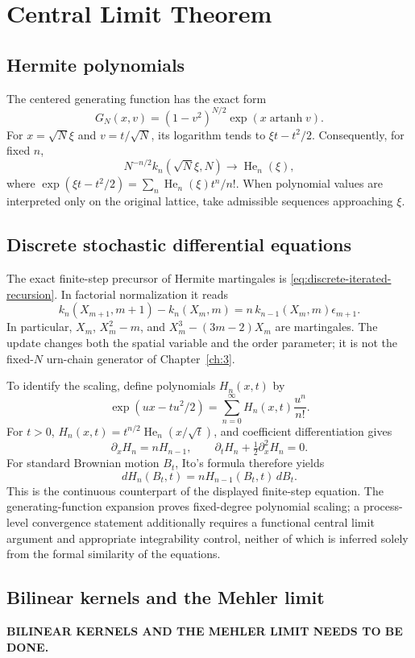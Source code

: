 \chapter{Central Limit Theorem}
\label{ch:11}
\section{Hermite polynomials}
\label{sec:11-1}
The centered generating function has the exact form
\[
G_N(x,v)=(1-v^2)^{N/2}\exp(x\operatorname{artanh}v).
\]
For $x=\sqrt N\xi$ and $v=t/\sqrt N$, its logarithm tends to $\xi t-t^2/2$. Consequently, for fixed $n$,
\[
N^{-n/2}k_n(\sqrt N\xi,N)\longrightarrow\operatorname{He}_n(\xi),
\]
where $\exp(\xi t-t^2/2)=\sum_n\operatorname{He}_n(\xi)t^n/n!$. When polynomial values are interpreted only on the original lattice, take admissible sequences approaching $\xi$.

\section{Discrete stochastic differential equations}
\label{sec:11-2}
The exact finite-step precursor of Hermite martingales is \eqref{eq:discrete-iterated-recursion}. In factorial normalization it reads
\[
k_n(X_{m+1},m+1)-k_n(X_m,m)
=n\,k_{n-1}(X_m,m)\epsilon_{m+1}.
\]
In particular, $X_m$, $X_m^2-m$, and $X_m^3-(3m-2)X_m$ are martingales. The update changes both the spatial variable and the order parameter; it is not the fixed-$N$ urn-chain generator of Chapter~\ref{ch:3}.

To identify the scaling, define polynomials $H_n(x,t)$ by
\[
\exp(ux-tu^2/2)=\sum_{n=0}^{\infty}H_n(x,t)\frac{u^n}{n!}.
\]
For $t>0$, $H_n(x,t)=t^{n/2}\operatorname{He}_n(x/\sqrt t)$, and coefficient differentiation gives
\[
\partial_xH_n=nH_{n-1},\qquad
\partial_tH_n+\tfrac12\partial_x^2H_n=0.
\]
For standard Brownian motion $B_t$, Ito's formula therefore yields
\[
dH_n(B_t,t)=nH_{n-1}(B_t,t)\,dB_t.
\]
This is the continuous counterpart of the displayed finite-step equation. The generating-function expansion proves fixed-degree polynomial scaling; a process-level convergence statement additionally requires a functional central limit argument and appropriate integrability control, neither of which is inferred solely from the formal similarity of the equations.

\section{Bilinear kernels and the Mehler limit}
\label{sec:11-3}

\noindent\textbf{BILINEAR KERNELS AND THE MEHLER LIMIT NEEDS TO BE DONE.}


